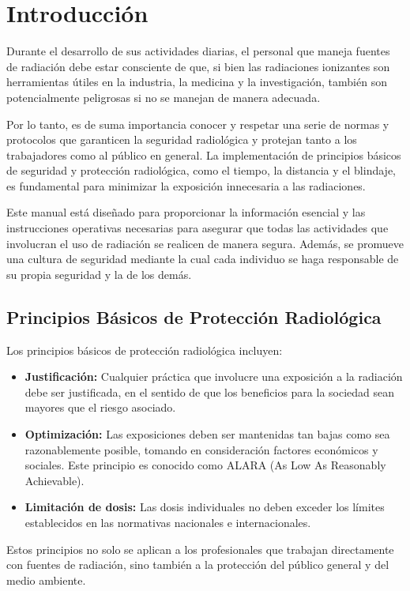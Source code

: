 \section{Introducción}

Durante el desarrollo de sus actividades diarias, el personal que maneja fuentes de radiación debe estar consciente de que, si bien las radiaciones ionizantes son herramientas útiles en la industria, la medicina y la investigación, también son potencialmente peligrosas si no se manejan de manera adecuada.

Por lo tanto, es de suma importancia conocer y respetar una serie de normas y protocolos que garanticen la seguridad radiológica y protejan tanto a los trabajadores como al público en general. La implementación de principios básicos de seguridad y protección radiológica, como el tiempo, la distancia y el blindaje, es fundamental para minimizar la exposición innecesaria a las radiaciones.

Este manual está diseñado para proporcionar la información esencial y las instrucciones operativas necesarias para asegurar que todas las actividades que involucran el uso de radiación se realicen de manera segura. Además, se promueve una cultura de seguridad mediante la cual cada individuo se haga responsable de su propia seguridad y la de los demás.

\subsection{Principios Básicos de Protección Radiológica}

Los principios básicos de protección radiológica incluyen:

\begin{itemize}
  \item \textbf{Justificación:} Cualquier práctica que involucre una exposición a la radiación debe ser justificada, en el sentido de que los beneficios para la sociedad sean mayores que el riesgo asociado.
  \item \textbf{Optimización:} Las exposiciones deben ser mantenidas tan bajas como sea razonablemente posible, tomando en consideración factores económicos y sociales. Este principio es conocido como ALARA (As Low As Reasonably Achievable).
  \item \textbf{Limitación de dosis:} Las dosis individuales no deben exceder los límites establecidos en las normativas nacionales e internacionales.
\end{itemize}

Estos principios no solo se aplican a los profesionales que trabajan directamente con fuentes de radiación, sino también a la protección del público general y del medio ambiente.